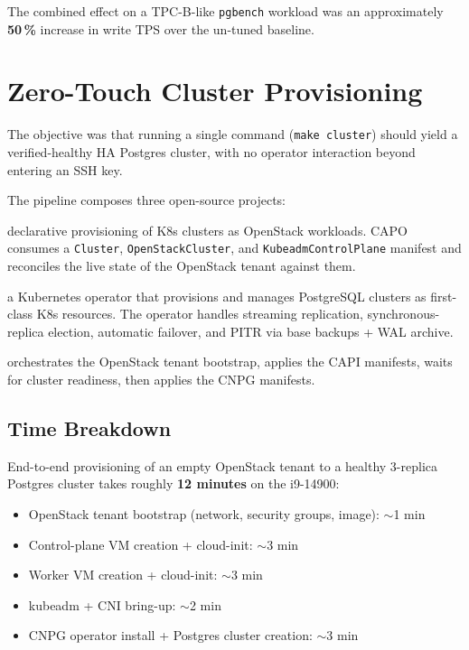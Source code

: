\documentclass[12pt,a4paper,oneside]{report}
\begin{document}
The combined effect on a TPC-B-like \texttt{pgbench} workload was an approximately \textbf{50\,\%} increase in write TPS over the un-tuned baseline.

\section{Zero-Touch Cluster Provisioning}

The objective was that running a single command (\texttt{make cluster}) should yield a verified-healthy HA Postgres cluster, with no operator interaction beyond entering an SSH key.

The pipeline composes three open-source projects:

\begin{description}[leftmargin=*]
    \item[Cluster API for OpenStack (CAPO):] declarative provisioning of K8s clusters as OpenStack workloads. CAPO consumes a \texttt{Cluster}, \texttt{OpenStackCluster}, and \texttt{KubeadmControlPlane} manifest and reconciles the live state of the OpenStack tenant against them.
    \item[CloudNativePG (CNPG):] a Kubernetes operator that provisions and manages PostgreSQL clusters as first-class K8s resources. The operator handles streaming replication, synchronous-replica election, automatic failover, and PITR via base backups + WAL archive.
    \item[A small Make/shell wrapper:] orchestrates the OpenStack tenant bootstrap, applies the CAPI manifests, waits for cluster readiness, then applies the CNPG manifests.
\end{description}

\subsection{Time Breakdown}

End-to-end provisioning of an empty OpenStack tenant to a healthy 3-replica Postgres cluster takes roughly \textbf{12 minutes} on the i9-14900:

\begin{itemize}[leftmargin=*]
    \item OpenStack tenant bootstrap (network, security groups, image): $\sim$1 min
    \item Control-plane VM creation + cloud-init: $\sim$3 min
    \item Worker VM creation + cloud-init: $\sim$3 min
    \item kubeadm + CNI bring-up: $\sim$2 min
    \item CNPG operator install + Postgres cluster creation: $\sim$3 min
\end{itemize}
\end{document}
